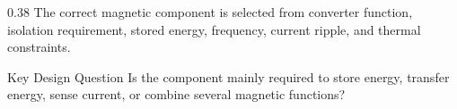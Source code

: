 \begin{frame}
\begin{columns}
        \begin{column}{0.38\textwidth}
            The correct magnetic component is selected from converter function, isolation requirement, stored energy, frequency, current ripple, and thermal constraints.
            \begin{block}{Key Design Question}
                Is the component mainly required to store energy, transfer energy, sense current, or combine several magnetic functions?
            \end{block}
        \end{column}
    \end{columns}
\end{frame}


